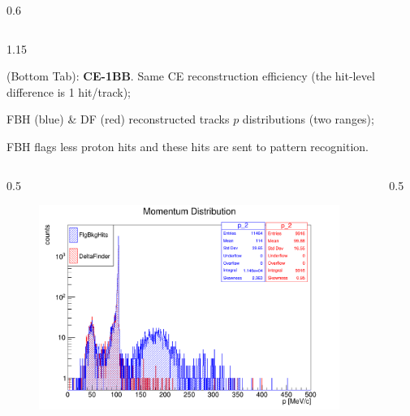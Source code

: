 \documentclass{beamer}
\begin{document}
\begin{frame}
\begin{columns}
\begin{column}{0.6\framewidth}
        \end{column}
    \end{columns}
    \vspace{-6mm}
 \begin{columns}
        \begin{column}{1.15\framewidth}
    \setlength{\leftmargini}{1.1em}
    \begin{itemize}
    {\footnotesize   
    \item (Bottom Tab): \textbf{CE-1BB}. Same CE reconstruction efficiency (the hit-level difference is 1 hit/track);
        \vspace{-0.5mm}
    \item FBH (blue) \& DF (red) reconstructed tracks $p$ distributions (two ranges);
    \vspace{-0.5mm}
    \item FBH flags less proton hits and these hits are sent to pattern recognition.
    }
    \end{itemize}
    \end{column}
    \end{columns}
        \vspace{-3mm}
     \begin{columns}
        \begin{column}{0.5\framewidth}
            \begin{figure}[!h]
        \centering
        \includegraphics[width =0.9\columnwidth]{figures/png/Screenshot_20240820_162125.png}
       \label{fig:momhits}
\end{figure}
        \end{column}
        \begin{column}{0.5\framewidth}
               \begin{figure}[!h]
        \centering

\end{figure}
\end{column}
\end{columns}
\end{frame}
\end{document}
